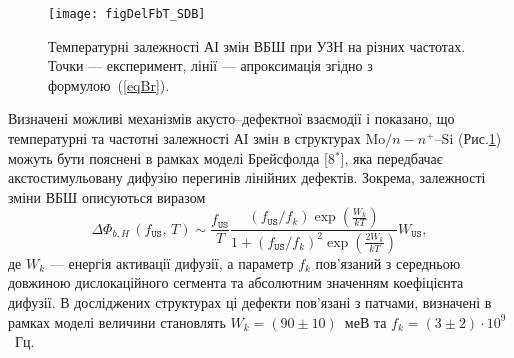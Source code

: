 \begin{figure}[b]
\center
\texttt{[image: figDelFbT\_SDB]}
\caption{\label{figDelFbT_SDB}
Температурні залежності АІ змін ВБШ при УЗН на різних частотах.
Точки --- експеримент,
лінії --- апроксимація згідно з формулою~(\ref{eqBr}).
}%
\end{figure}
Визначені можливі механізмів акусто--дефектної взаємодії і показано, що температурні та частотні залежності АІ змін в структурах
 Mo$/n-n^+$--Si (Рис.\ref{figDelFbT_SDB}) можуть бути пояснені в рамках моделі Брейсфолда
[8$^*$],
яка передбачає акстостимульовану дифузію перегинів лінійних дефектів.
Зокрема, залежності зміни ВБШ описуються виразом
\begin{equation}
\label{eqBr}
\Delta\Phi_{b,H}\,(f_\mathtt{US},\,T)\sim\frac{f_\mathtt{US}}{T}\frac{(f_\mathtt{US}/{f_k})\exp\left(\frac{W_k}{kT}\right)}
{1+(f_\mathtt{US}/{f_k})^2\exp\left(\frac{2W_k}{kT}\right)}W_\mathtt{US},
\end{equation}
де
$W_k$ --- енергія активації дифузії,
а параметр $f_k$ пов'язаний з середньою довжиною дислокаційного сегмента та абсолютним значенням коефіцієнта дифузії.
В досліджених структурах ці дефекти пов'язані з патчами,
визначені в рамках моделі величини становлять $W_k=(90\pm10)$~меВ та $f_k=(3\pm2)\cdot10^9$~Гц.


